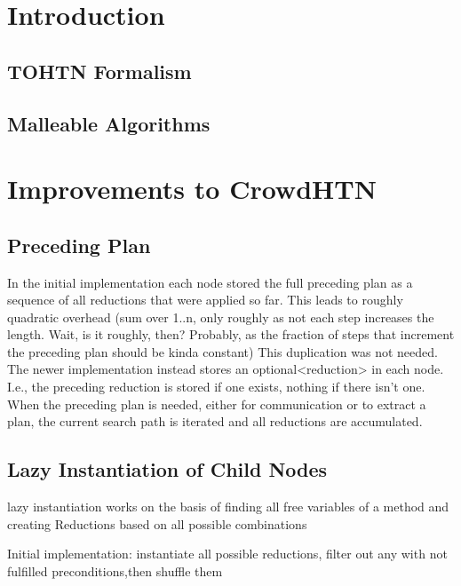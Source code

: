 \documentclass[12pt,a4paper,twoside]{scrartcl}
\numberwithin{equation}{section}
\begin{document}
\listoffigures
\listoftables
\listofalgorithms

\clearpage


\section{Introduction}

\subsection{TOHTN Formalism}

\subsection{Malleable Algorithms}

\section{Improvements to CrowdHTN}
\subsection{Preceding Plan}
In the initial implementation each node stored the full preceding plan as a sequence of all reductions that were applied so far. This leads to roughly quadratic overhead (sum over 1..n, only roughly as not each step increases the length. Wait, is it roughly, then? Probably, as the fraction of steps that increment the preceding plan should be kinda constant)
This duplication was not needed. The newer implementation instead stores an optional<reduction> in each node. I.e., the preceding reduction is stored if one exists, nothing if there isn't one. When the preceding plan is needed, either for communication or to extract a plan, the current search path is iterated and all reductions are accumulated.

\subsection{Lazy Instantiation of Child Nodes}
lazy instantiation works on the basis of finding all free variables of a method and creating Reductions based on all possible combinations

Initial implementation: instantiate all possible reductions, filter out any with not fulfilled preconditions,then shuffle them
\end{document}
